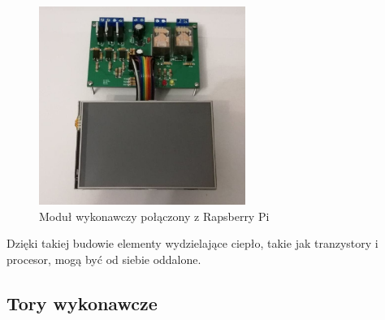 \documentclass[12pt, eng, twoside, openany, final]{mgr}
\begin{document}
        \begin{figure}[H]
            \begin{center}
            \includegraphics[width=0.6\textwidth]{poloczona_zoom.jpg}
            \caption{Moduł wykonawczy połączony z Rapsberry Pi}
            \end{center}
        \end{figure}
\noindent        Dzięki takiej budowie elementy wydzielające ciepło, takie jak tranzystory i procesor, mogą być od siebie oddalone. 

        
        \newpage
        \subsection{Tory wykonawcze}
\end{document}
